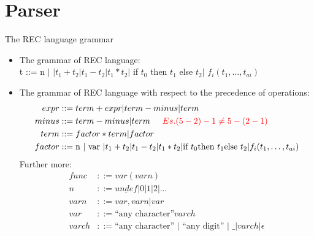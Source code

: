\documentclass{beamer}
\begin{document}
\section{Parser}
\begin{frame}{The REC language grammar}
	\begin{itemize}
		\item The grammar of REC language:\\
		t ::= n $|$  $| t_1 + t_2 | t_1 - t_2 | t_1 * t_2 |$
		if $t_0$ then $t_1$ else $t_2 |$ $f_i(t_1, \dots, t_{ai})$
		\item The grammar of REC language with respect to the precedence of operations:
		\begin{align*}
		expr &::= term + expr | term - minus | term\\
		minus &::= term - minus | term \hspace{0.5cm} \textcolor{red}{Es. (5-2)-1 \neq 5-(2-1)}\\
		term &::= factor * term | factor\\
		factor &::= \text{n } | \text{ var } | t_1 + t_2 | t_1 - t_2 | t_1 * t_2 |
		\text{if } t_0 \text{then } t_1 \text{else } t_2 | f_i(t_1, \dots, t_{ai})
		\end{align*}
		Further more:
		\begin{align*}
		func &::= var(varn)\\
		n &::= \underline{undef} | 0 | 1 | 2 | \dotsc\\
		varn &::= var , varn | var\\
		var &::= \text{``any character''} varch\\
		varch &::= \text{``any character'' } | \text{ ``any digit'' } | \text{ \_ } | varch | \epsilon
		\end{align*}
	\end{itemize}
\end{frame}
\end{document}
